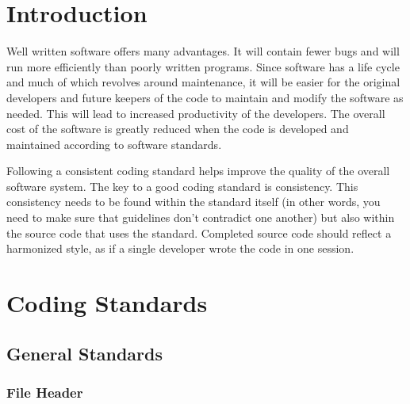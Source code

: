 \documentclass[12pt]{report}
\begin{document}

\section{Introduction}

\begin{flushleft}

Well written software offers many advantages. It will contain fewer bugs and will run
more efficiently than poorly written programs. Since software has a life cycle and much
of which revolves around maintenance, it will be easier for the original developers and
future keepers of the code to maintain and modify the software as needed. This will lead
to increased productivity of the developers. The overall cost of the software is greatly
reduced when the code is developed and maintained according to software standards.\\

\end{flushleft}

\begin{flushleft}

Following a consistent coding standard helps improve the quality of the overall software system. The key to a good coding standard is consistency. This consistency needs to be found within the standard itself (in other words, you need to make sure that guidelines don't contradict one another) but also within the source code that uses the standard. Completed source code should reflect a harmonized style, as if a single developer wrote the code in one session.

\end{flushleft}

\pagebreak

\section{Coding Standards}

\subsection{General Standards}

\subsubsection{File Header}
\end{document}
